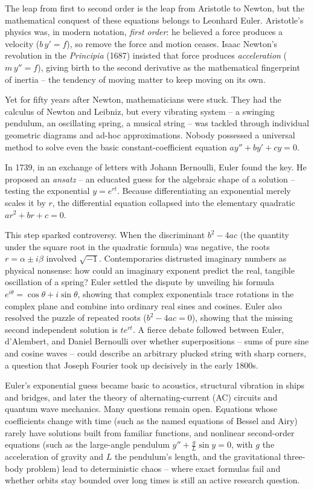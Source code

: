 \begin{historybox}
The leap from first to second order is the leap from Aristotle to Newton, but
the mathematical conquest of these equations belongs to Leonhard Euler.
Aristotle's physics was, in modern notation, \emph{first order}: he believed a
force produces a velocity ($b\,y' = f$), so remove the force and motion ceases.
Isaac Newton's revolution in the \emph{Principia} (1687) insisted that force
produces \emph{acceleration} ($m\,y'' = f$), giving birth to the second
derivative as the mathematical fingerprint of inertia -- the tendency of moving
matter to keep moving on its own.

Yet for fifty years after Newton, mathematicians were stuck. They had the
calculus of Newton and Leibniz, but every vibrating system -- a swinging
pendulum, an oscillating spring, a musical string -- was tackled through
individual geometric diagrams and ad-hoc approximations. Nobody possessed a
universal method to solve even the basic constant-coefficient equation
$a y'' + b y' + c y = 0$.

In 1739, in an exchange of letters with Johann Bernoulli, Euler found the key.
He proposed an \emph{ansatz} -- an educated guess for the algebraic shape of a
solution -- testing the exponential $y = e^{rt}$. Because differentiating an
exponential merely scales it by $r$, the differential equation collapsed into the
elementary quadratic $a r^2 + b r + c = 0$.

This step sparked controversy. When the discriminant $b^2 - 4ac$ (the quantity
under the square root in the quadratic formula) was negative,
the roots $r = \alpha \pm i\beta$ involved $\sqrt{-1}$. Contemporaries
distrusted imaginary numbers as physical nonsense: how could an imaginary
exponent predict the real, tangible oscillation of a spring? Euler settled the
dispute by unveiling his formula $e^{i\theta} = \cos\theta + i\sin\theta$,
showing that complex exponentials trace rotations in the complex plane and combine
into ordinary real sines and cosines. Euler also resolved the puzzle of repeated
roots ($b^2 - 4ac = 0$), showing that the missing second independent solution is
$t e^{rt}$. A fierce debate followed between Euler,
d'Alembert, and Daniel Bernoulli over whether superpositions -- sums of pure sine
and cosine waves -- could describe an arbitrary plucked string with sharp corners,
a question that Joseph Fourier took up decisively in the early 1800s.

Euler's exponential guess became basic to acoustics, structural vibration in ships
and bridges, and later the theory of alternating-current (AC) circuits and
quantum wave mechanics. Many questions remain open. Equations whose
coefficients change with time (such as the named equations of Bessel and Airy)
rarely have solutions built from familiar functions, and nonlinear second-order
equations (such as the large-angle pendulum $y'' + \frac{g}{L}\sin y = 0$, with
$g$ the acceleration of gravity and $L$ the pendulum's length, and the
gravitational three-body problem) lead to deterministic chaos -- where exact
formulas fail and whether orbits stay bounded over long times is still an active
research question.
\end{historybox}

